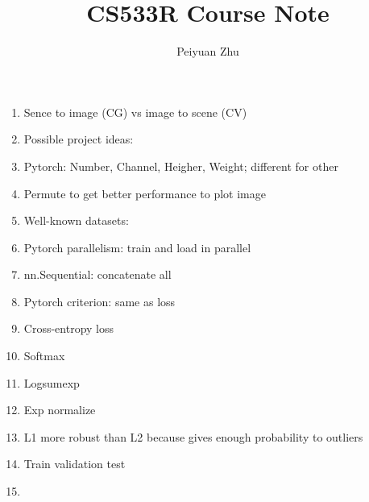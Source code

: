 \documentclass{article}
\title{CS533R Course Note}
\author{Peiyuan Zhu}
\begin{document}
	\maketitle
	\section{}
	\begin{enumerate}
		\item Sence to image (CG) vs image to scene (CV)
		\item Possible project ideas:
		\item Pytorch: Number, Channel, Heigher, Weight; different for other
		\item Permute to get better performance to plot image
		\item Well-known datasets:
		\item Pytorch parallelism: train and load in parallel
		\item nn.Sequential: concatenate all
		\item Pytorch criterion: same as loss
		\item Cross-entropy loss
		\item Softmax
		\item Logsumexp
		\item Exp normalize
		\item L1 more robust than L2 because gives enough probability to outliers
		\item Train validation test
		\item 
	\end{enumerate}
\end{document}
